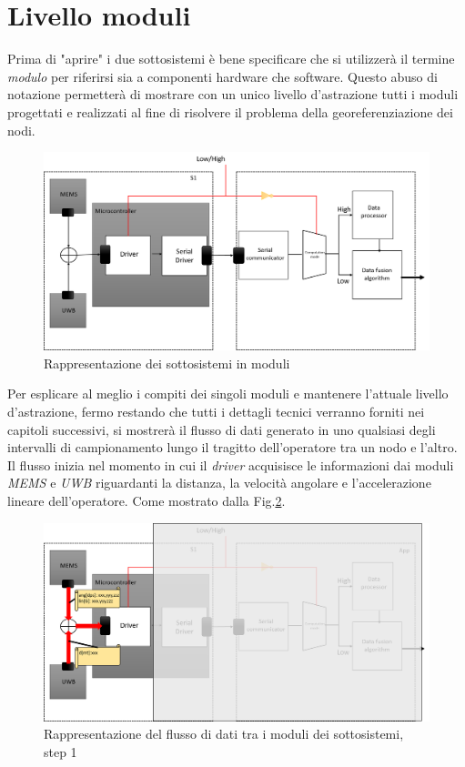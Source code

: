 \section{Livello moduli}

Prima di "aprire" i due sottosistemi è bene specificare che si utilizzerà il termine \textit{modulo} per riferirsi sia a componenti hardware che software. Questo abuso di notazione permetterà di mostrare con un unico livello d'astrazione tutti i moduli progettati e realizzati al fine di risolvere il problema della georeferenziazione dei nodi.
\begin{figure}[H]  
\includegraphics[scale=0.3 ]{DescrizioneDelSistema/sistema_liv2.png}
\caption{Rappresentazione dei sottosistemi in moduli}
\label{fig:sistema_liv2}
\end{figure}
Per esplicare al meglio i compiti dei singoli moduli e mantenere l'attuale livello d'astrazione, fermo restando che tutti i dettagli tecnici verranno forniti nei capitoli successivi, si mostrerà il flusso di dati generato in uno qualsiasi degli intervalli di campionamento lungo il tragitto dell'operatore tra un nodo e l'altro.\\ 
Il flusso inizia nel momento in cui il \textit{driver} acquisisce le informazioni dai moduli \textit{MEMS} e \textit{UWB} riguardanti la distanza, la velocità angolare e l'accelerazione lineare dell'operatore. Come mostrato dalla Fig.\ref{fig:flusso1}. 
\begin{figure}[H] 
	\centering 
	\includegraphics[scale=0.25 ]{DescrizioneDelSistema/flusso1.png}
	\caption{Rappresentazione del flusso di dati tra i moduli dei sottosistemi, step 1}
	\label{fig:flusso1}
\end{figure}

